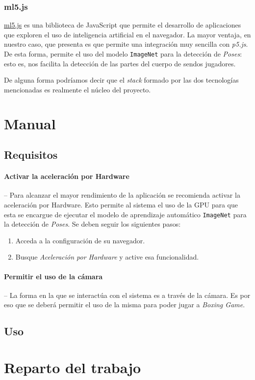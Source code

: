 \documentclass{article}
\begin{document}
\subsubsection{ml5.js}

\href{https://ml5js.org/}{ml5.js} es una biblioteca de JavaScript que permite el desarrollo de aplicaciones que exploren el uso de inteligencia artificial en el navegador. La mayor ventaja, en nuestro caso, que presenta es que permite una integración muy sencilla con \textit{p5.js}. De esta forma, permite el uso del modelo \texttt{ImageNet} para la detección de \textit{Poses}: esto es, nos facilita la detección de las partes del cuerpo de sendos jugadores.

De alguna forma podríamos decir que el \textit{stack} formado por las dos tecnologías mencionadas es realmente el núcleo del proyecto.

\section{Manual}
\label{section:manual}

\subsection{Requisitos}

\paragraph{Activar la aceleración por Hardware} \mbox{} -- Para alcanzar el mayor rendimiento de la aplicación se recomienda activar la aceleración por Hardware. Esto permite al sistema el uso de la GPU para que esta se encargue de ejecutar el modelo de aprendizaje automático \texttt{ImageNet} para la detección de \textit{Poses}. Se deben seguir los siguientes pasos:

\begin{enumerate}
    \item Acceda a la configuración de su navegador.
    \item Busque \textit{Aceleración por Hardware} y active esa funcionalidad.
\end{enumerate}

\paragraph{Permitir el uso de la cámara} \mbox{} -- La forma en la que se interactúa con el sistema es a través de la cámara. Es por eso que se deberá permitir el uso de la misma para poder jugar a \textit{Boxing Game}.

\subsection{Uso}

\section{Reparto del trabajo}
\label{section:work}
\end{document}
